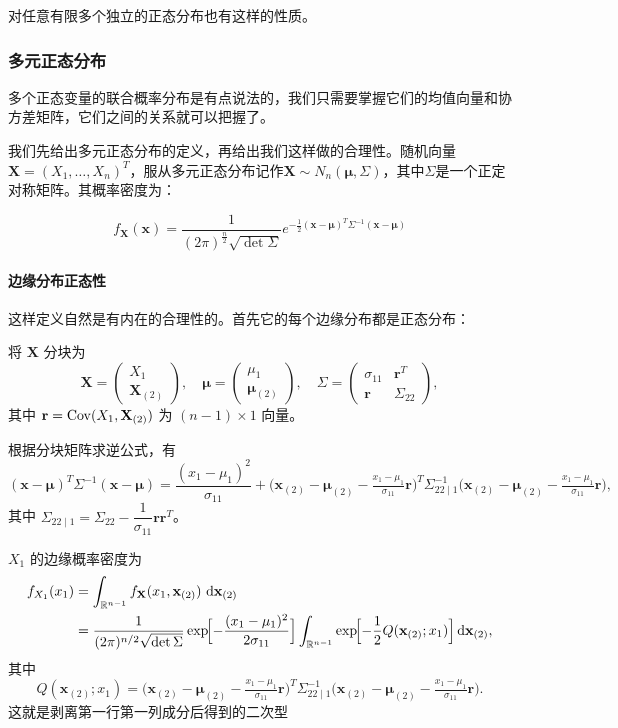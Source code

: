 对任意有限多个独立的正态分布也有这样的性质。

\subsubsection{多元正态分布}

多个正态变量的联合概率分布是有点说法的，我们只需要掌握它们的均值向量和协方差矩阵，它们之间的关系就可以把握了。

我们先给出多元正态分布的定义，再给出我们这样做的合理性。随机向量$\textbf{X}=(X_1,\ldots,X_n)^T$，服从多元正态分布记作$\mathbf{X} \sim N_n(\boldsymbol{\mu},\Sigma)$，其中$\Sigma$是一个正定对称矩阵。其概率密度为：

\[
f_{\mathbf{X}}(\mathbf{x})=\frac{1}{(2\pi)^{\frac n2}\sqrt{\det \Sigma}}e^{-\frac12(\mathbf{x}-\boldsymbol{\mu})^T\Sigma^{-1}(\mathbf{x}-\boldsymbol{\mu})}
\]

\paragraph{边缘分布正态性}
这样定义自然是有内在的合理性的。首先它的每个边缘分布都是正态分布：

将 $\mathbf{X}$ 分块为
\[
\mathbf{X} = \begin{pmatrix} X_1 \\ \mathbf{X}_{(2)} \end{pmatrix},\quad
\boldsymbol{\mu} = \begin{pmatrix} \mu_1 \\ \boldsymbol{\mu}_{(2)} \end{pmatrix},\quad
\Sigma = \begin{pmatrix} \sigma_{11} & \mathbf{r}^T \\[2pt] \mathbf{r} & \Sigma_{22} \end{pmatrix},
\]
其中 $\mathbf{r} = \operatorname{\operatorname{Cov}}(X_1, \mathbf{X}_{(2)})$ 为 $ (n-1)\times 1 $ 向量。

根据分块矩阵求逆公式，有
\[
(\mathbf{x} - \boldsymbol{\mu})^T \Sigma^{-1} (\mathbf{x} - \boldsymbol{\mu})
= \frac{(x_1 - \mu_1)^2}{\sigma_{11}}
+ \bigl(\mathbf{x}_{(2)} - \boldsymbol{\mu}_{(2)} - \tfrac{x_1 - \mu_1}{\sigma_{11}}\mathbf{r}\bigr)^T
\Sigma_{22\mid 1}^{-1}
\bigl(\mathbf{x}_{(2)} - \boldsymbol{\mu}_{(2)} - \tfrac{x_1 - \mu_1}{\sigma_{11}}\mathbf{r}\bigr),
\]
其中 $\Sigma_{22\mid 1} = \Sigma_{22} - \dfrac{1}{\sigma_{11}} \mathbf{r} \mathbf{r}^T$。

$X_1$ 的边缘概率密度为
\begin{align*}
f_{X_1}(x_1) &= \int_{\mathbb{R}^{n-1}} f_{\mathbf{X}}(x_1, \mathbf{x}_{(2)}) \, \mathop{}\!\mathrm{d}\mathbf{x}_{(2)} \\
&= \frac{1}{(2\pi)^{n/2} \sqrt{\det \Sigma}}
\exp\!\Bigl[ -\frac{(x_1 - \mu_1)^2}{2\sigma_{11}} \Bigr]
\int_{\mathbb{R}^{n-1}}
\exp\!\Bigl[ -\frac{1}{2} Q(\mathbf{x}_{(2)}; x_1) \Bigr] \mathop{}\!\mathrm{d}\mathbf{x}_{(2)},
\end{align*}
其中
\[
Q(\mathbf{x}_{(2)}; x_1) =
\bigl(\mathbf{x}_{(2)} - \boldsymbol{\mu}_{(2)} - \tfrac{x_1 - \mu_1}{\sigma_{11}}\mathbf{r}\bigr)^T
\Sigma_{22\mid 1}^{-1}
\bigl(\mathbf{x}_{(2)} - \boldsymbol{\mu}_{(2)} - \tfrac{x_1 - \mu_1}{\sigma_{11}}\mathbf{r}\bigr).
\]
这就是剥离第一行第一列成分后得到的二次型

